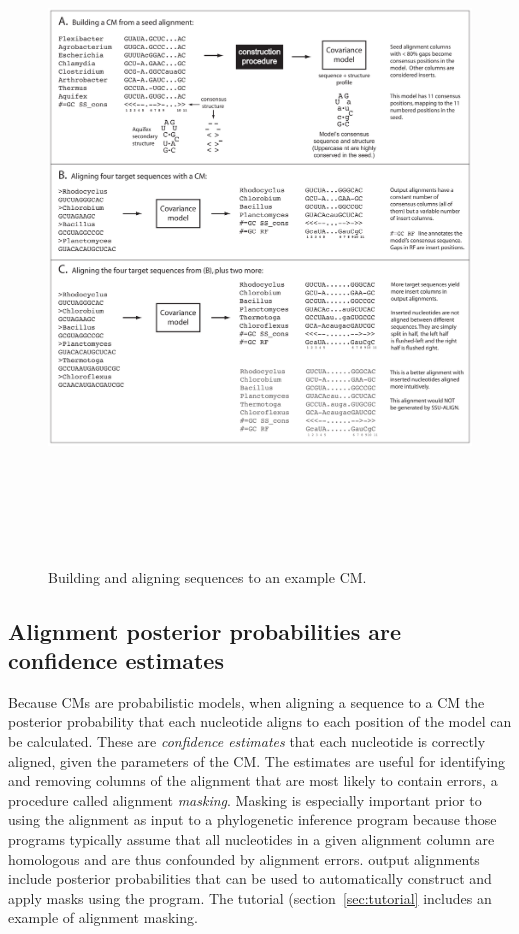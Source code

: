 \begin{figure}
\begin{center}
\includegraphics[height=7in]{Figures/sa-toy-example}
\caption{Building and aligning sequences to an example CM.}
\end{center}
\label{fig:toyex}
\end{figure}


\subsection{Alignment posterior probabilities are confidence estimates}
\label{sec:background-pp}

Because CMs are probabilistic models, when aligning a sequence to a CM
the posterior probability that each nucleotide aligns to each position
of the model can be calculated. 
These are \emph{confidence estimates} that each
nucleotide is correctly aligned, given the parameters of the CM. The
estimates are useful for identifying and removing columns of the
alignment that are most likely to contain errors, a procedure called
alignment \emph{masking}. Masking is especially important prior to
using the alignment as input to a phylogenetic inference program
because those programs typically assume that all nucleotides in a
given alignment column are homologous and are thus confounded by 
alignment errors.  output alignments include posterior
probabilities that can be used to automatically construct and apply
masks using the  program. The tutorial
(section~\ref{sec:tutorial} includes an example of alignment masking. 


